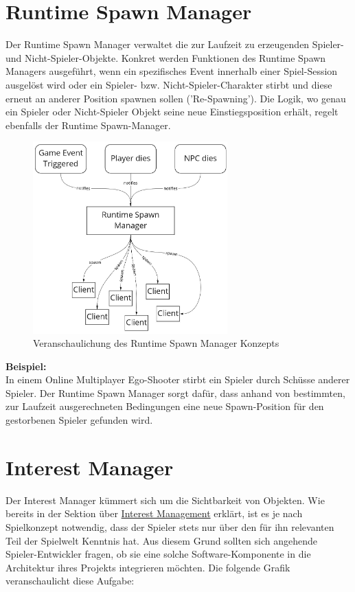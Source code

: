 \section{Runtime Spawn Manager}
\label{spawn_manager}

Der Runtime Spawn Manager verwaltet die zur Laufzeit zu erzeugenden Spieler- und Nicht-Spieler-Objekte. Konkret werden Funktionen des Runtime Spawn Managers ausgeführt, wenn ein spezifisches Event innerhalb einer Spiel-Session ausgelöst wird oder ein Spieler- bzw. Nicht-Spieler-Charakter stirbt und diese erneut an anderer Position spawnen sollen ('Re-Spawning'). Die Logik, wo genau ein Spieler oder Nicht-Spieler Objekt seine neue Einstiegsposition erhält, regelt ebenfalls der Runtime Spawn-Manager.

\begin{figure}[H]
	\centering
	\includegraphics[width=75mm]{images/Runtime_Spawn_Manager.jpg}
	\caption[Runtime Spawn Manager]{Veranschaulichung des Runtime Spawn Manager Konzepts}
	\label{pic:Runtime_Spawn_Manager}
\end{figure}

\textbf{Beispiel:} \\
In einem Online Multiplayer Ego-Shooter \cite{Y.Kim.2007} stirbt ein Spieler durch Schüsse anderer Spieler. Der Runtime Spawn Manager sorgt dafür, dass anhand von bestimmten, zur Laufzeit ausgerechneten Bedingungen eine neue Spawn-Position für den gestorbenen Spieler gefunden wird. 


\section{Interest Manager}

Der Interest Manager kümmert sich um die Sichtbarkeit von Objekten. Wie bereits in der Sektion über \hyperref[interest_management]{Interest Management} erklärt, ist es je nach Spielkonzept notwendig, dass der Spieler stets nur über den für ihn relevanten Teil der Spielwelt Kenntnis hat. Aus diesem Grund sollten sich angehende Spieler-Entwickler fragen, ob sie eine solche Software-Komponente in die Architektur ihres Projekts integrieren möchten. Die folgende Grafik veranschaulicht diese Aufgabe:

